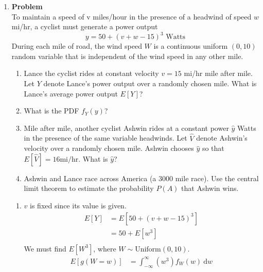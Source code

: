 \documentclass[12pt]{article}
\newenvironment{Ex}{\textbf{Problem}\vspace{.75em}\\}{}
\newcommand{\dd}[1]{\:\mathrm{d}{#1}}
\begin{document}
\begin{enumerate}
\item
  \begin{Ex}
    To maintain a speed of v miles/hour in the presence of a headwind
    of speed $w$ mi/hr, a cyclist must generate a power output
    \begin{equation}
      \label{eq:4-power}
      y = 50 + (v + w - 15)^3 \text{ Watts}
    \end{equation}
    During each mile of road, the wind speed
    $W$ is a continuous uniform $(0,10)$ random variable that is
    independent of the wind speed in any other mile.
    \begin{enumerate}
    \item Lance the cyclist rides at constant velocity $v = 15$ mi/hr
      mile after mile. Let $Y$ denote Lance's power output over a
      randomly chosen mile. What is Lance's average power output
      $E[Y]$?
    \item What is the PDF $f_Y (y)$?
    \item Mile after mile, another cyclist Ashwin rides at a constant
      power $\hat{y}$ Watts in the presence of the same variable
      headwinds. Let $\hat{V}$ denote Ashwin's velocity over a
      randomly chosen mile. Ashwin chooses $\hat{y}$ so that
      $E[\hat{V}] = 16 \text{mi/hr}$. What is $\hat{y}$?
    \item Ashwin and Lance race across America (a 3000 mile race). Use
      the central limit theorem to estimate the probability $P(A)$
      that Ashwin wins.
    \end{enumerate}
    \begin{solution} \hfill
      \begin{enumerate}
      \item $v$ is fixed since its value is given.
        \begin{equation}
          \label{eq:4a-presol}
          \begin{aligned}
            E[Y] &= E[50 + (v+w-15)^3] \\
            &= 50 + E[w^3] \\
          \end{aligned}
        \end{equation}
        We must find $E[W^3]$, where $W\sim\text{Uniform}(0,10)$.
        \begin{equation}
          \label{eq:4a-w-cubed}
          \begin{aligned}
            E[g(W=w)] &= \int_{-\infty}^{\infty} (w^3)f_W(w) \dd{w} \\

\end{aligned}
\end{equation}
\end{enumerate}
\end{solution}
\end{Ex}
\end{enumerate}
\end{document}

